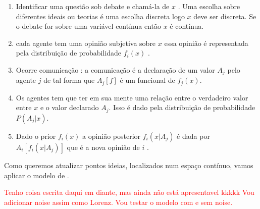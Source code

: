 \begin{enumerate}
\item Identificar uma questão sob debate e chamá-la de $x$ . Uma
  escolha sobre diferentes ideais ou teorias é uma escolha discreta
  logo $x$ deve ser discreta. Se o debate for sobre uma variável
  contínua então $x$ é contínua.
\item cada agente tem uma opinião subjetiva sobre $x$ essa opinião é
  representada pela distribuição de probabilidade $f_i(x)$ .
\item Ocorre comunicação : a comunicação é a declaração de um valor
  $ A_j$ pelo agente $j$ de tal forma que $A_j[f]$ é um funcional de
  $f_j(x)$.
\item Os agentes tem que ter em sua mente  uma relação entre o
  verdadeiro valor entre $x$ e o valor declarado $A_j$. Isso é dado
  pela distribuição de probabilidade $P(A_j|x)$.
\item Dado o prior $f_i(x)$ a opinião posterior $f_i(x|A_j)$ é dada
  por $A_i[f_i(x|A_j)]$ que é a nova opinião de $i$ .
\end{enumerate}

Como queremos atualizar pontos ideias, localizados num espaço contínuo, vamos
aplicar o modelo de .

  \textcolor{red}{Tenho coisa escrita daqui em diante, mas ainda não está
    apresentavel kkkkk }
  \textcolor{red}{Vou adicionar noise assim como Lorenz. Vou testar o modelo com
  e sem noise.}
